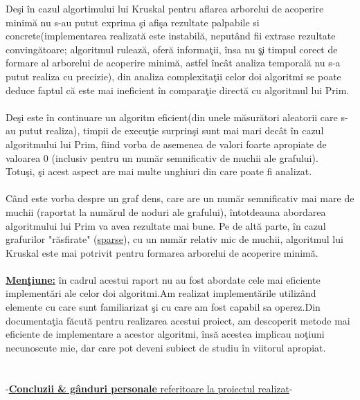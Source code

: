 \documentclass[14pt]{article}
\begin{document}
\vspace{3mm}
\newline
De\c si \^in cazul algortimului lui Kruskal pentru aflarea arborelui de acoperire minim\u{a} nu s-au putut exprima \c si afi\c sa rezultate palpabile si concrete(implementarea realizat\u{a} este instabil\u{a}, neput\^and fii extrase rezultate conving\u{a}toare; algoritmul ruleaz\u{a}, ofer\u{a} informa\c tii, \^insa nu \c \c si timpul corect de formare al arborelui de acoperire minim\u{a}, astfel \^inc\^at analiza temporal\u{a} nu s-a putut realiza cu precizie), din analiza complexita\c tii celor doi algoritmi se poate deduce faptul c\u{a} este mai ineficient \^in compara\c tie direct\u{a} cu algoritmul lui Prim.\\
\\
De\c si este \^in continuare un algoritm eficient(din unele m\u{a}sur\u{a}tori aleatorii care s-au putut realiza), timpii de execu\c tie surprin\c si sunt mai mari dec\^at \^in cazul algoritmului lui Prim, fiind vorba de asemenea de valori foarte apropiate de valoarea 0 (inclusiv pentru un num\u{a}r semnificativ de muchii ale grafului).\\
Totu\c si, \c si acest aspect are mai multe unghiuri din care poate fi analizat.\\\\C\^and este vorba despre un graf dens, care are un num\u{a}r semnificativ mai mare de muchii (raportat la num\u{a}rul de noduri ale grafului), \^intotdeauna abordarea algoritmului lui Prim va avea rezultate mai bune. Pe de alt\u{a} parte, \^in cazul grafurilor "r\u{a}sfirate" (\underline{sparse}), cu un num\u{a}r relativ mic de muchii, algoritmul lui Kruskal este mai potrivit pentru formarea arborelui de acoperire minim\u{a}.\\
\\
\underline{\textbf{Men\c tiune:}} \^in cadrul acestui raport nu au fost abordate cele mai eficiente implement\u{a}ri ale celor doi algoritmi.Am realizat implement\u{a}rile utiliz\^and elemente cu care sunt familiarizat \c si cu care am fost capabil sa operez.Din documenta\c tia f\u{a}cut\u{a} pentru realizarea acestui proiect, am descoperit metode mai eficiente de implementare a acestor algoritmi, \^ins\u{a} acestea implicau no\c tiuni necunoscute mie, dar care pot deveni subiect de studiu \^in viitorul apropiat.
\\\\\\
-\underline{\textbf{Concluzii \& g\^anduri personale} referitoare la proiectul realizat}-\\
\end{document}

